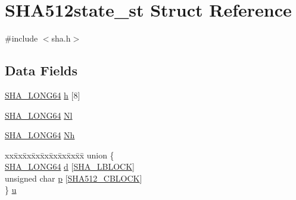 \hypertarget{struct_s_h_a512state__st}{}\section{S\+H\+A512state\+\_\+st Struct Reference}
\label{struct_s_h_a512state__st}


{\ttfamily \#include $<$sha.\+h$>$}

\subsection*{Data Fields}
\begin{DoxyCompactItemize}
\item 
\hyperlink{include_2openssl_2sha_8h_a26681fbb750476e9b7532b8744916024}{S\+H\+A\+\_\+\+L\+O\+N\+G64} \hyperlink{struct_s_h_a512state__st_aa863cca2bee8e84059783d0ea425296a}{h} \mbox{[}8\mbox{]}
\item 
\hyperlink{include_2openssl_2sha_8h_a26681fbb750476e9b7532b8744916024}{S\+H\+A\+\_\+\+L\+O\+N\+G64} \hyperlink{struct_s_h_a512state__st_afe572d1e0fb8cc860669a2539f3f4103}{Nl}
\item 
\hyperlink{include_2openssl_2sha_8h_a26681fbb750476e9b7532b8744916024}{S\+H\+A\+\_\+\+L\+O\+N\+G64} \hyperlink{struct_s_h_a512state__st_a4cb6c7a664e1c4ffe7657d10422cfe76}{Nh}
\item 
\begin{tabbing}
xx\=xx\=xx\=xx\=xx\=xx\=xx\=xx\=xx\=\kill
union \{\\
\>\hyperlink{include_2openssl_2sha_8h_a26681fbb750476e9b7532b8744916024}{SHA\_LONG64} \hyperlink{struct_s_h_a512state__st_a90a4b0655724c1af4884f929f2ade45f}{d} \mbox{[}\hyperlink{include_2openssl_2sha_8h_a8902af97bc4411166213b43c6d2057d2}{SHA\_LBLOCK}\mbox{]}\\
\>unsigned char \hyperlink{struct_s_h_a512state__st_a2f3a1cc4e437a508391b2b4ec2c0e572}{p} \mbox{[}\hyperlink{include_2openssl_2sha_8h_a322ff23dfbf746e0864f4e81786141b6}{SHA512\_CBLOCK}\mbox{]}\\
\} \hyperlink{struct_s_h_a512state__st_adaa1bccc983949f08b5e6cd788c28185}{u}\\


\end{tabbing}
\end{DoxyCompactItemize}
